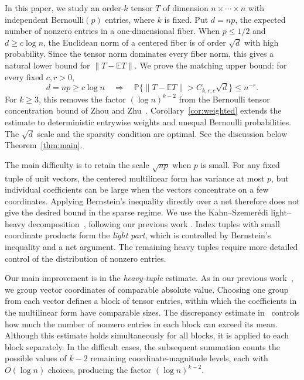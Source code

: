 \documentclass[11pt,reqno]{amsart}
\numberwithin{equation}{section}
\theoremstyle{definition}
\theoremstyle{remark}
\newcommand{\E}{\mathbb E}
\newcommand{\Pp}{\mathbb P}
\begin{document}
In this paper, we study an order-$k$ tensor $T$ of dimension
$n\times\cdots\times n$ with independent Bernoulli$(p)$ entries,
where $k$ is fixed. Put $d=np$, the expected number of nonzero entries
in a one-dimensional fiber. When $p\le1/2$ and $d\ge c\log n$, the
Euclidean norm of a centered fiber is of order $\sqrt d$ with high
probability. Since the tensor norm dominates every fiber norm, this
gives a natural lower bound for $\|T-\E T\|$. We prove the matching
upper bound: for every fixed $c,r>0$,
\[
 d=np\ge c\log n
 \quad\Longrightarrow\quad
 \Pp\{\|T-\E T\|>C_{k,r,c}\sqrt d\}\le n^{-r}.
\]
For $k\ge3$, this removes the factor $(\log n)^{k-2}$ from the
Bernoulli tensor concentration bound of
Zhou and Zhu~\cite{ZZ21}.
Corollary~\ref{cor:weighted} extends the estimate to deterministic
entrywise weights and unequal Bernoulli probabilities. The $\sqrt{d}$ scale and the sparsity condition are optimal. See the discussion below Theorem~\ref{thm:main}.

The main difficulty is to retain the  scale $\sqrt{np}$ when $p$ is small.
For any fixed tuple of unit vectors, the centered multilinear form
has variance at most $p$, but individual coefficients can be large
when the vectors concentrate on a few coordinates. Applying
Bernstein's inequality directly over a net therefore does not give
the desired bound in the sparse regime. We use the
Kahn--Szemer\'edi light--heavy decomposition~\cite{FKS89}, following
our previous work \cite[Section~4]{ZZ21}. Index tuples with small coordinate products
form the \textit{light part}, which is controlled by Bernstein's inequality
and a net argument. The remaining heavy tuples require more detailed
control of the distribution of nonzero entries.

Our main improvement is in the \textit{heavy-tuple} estimate.
As in our previous work~\cite[Section~4.3]{ZZ21}, we group vector
coordinates of comparable absolute value. Choosing one group from
each vector defines a block of tensor entries, within which the
coefficients in the multilinear form have comparable sizes.
The discrepancy estimate in~\cite[Lemma~4.4]{ZZ21} controls how
much the number of nonzero entries in each block can exceed its
mean. Although this estimate holds simultaneously for all blocks,
it is applied to each block separately. In the difficult cases,
the subsequent summation counts the possible values of $k-2$
remaining coordinate-magnitude levels, each with $O(\log n)$ choices, producing
the factor $(\log n)^{k-2}$. 
\end{document}
